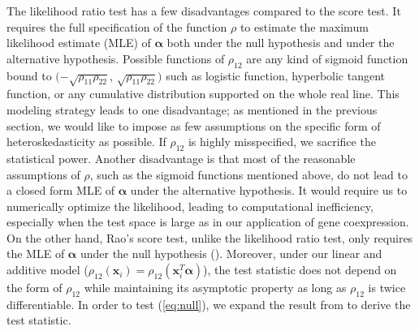 \documentclass[aap,authoryear, preprint]{imsart}
\numberwithin{equation}{section}
\theoremstyle{plain}
\begin{document}
The likelihood ratio test has a few disadvantages compared to the score test. It requires the full specification of the function $\rho$ to estimate the maximum likelihood estimate (MLE) of $\bm{\alpha}$ both under the null hypothesis and under the alternative hypothesis. Possible functions of $\rho_{12}$ are any kind of sigmoid function bound to $(-\sqrt{\rho_{11}\rho_{22}}$, $\sqrt{\rho_{11}\rho_{22}})$ such as logistic function, hyperbolic tangent function, or any cumulative distribution supported on the whole real line. This modeling strategy leads to one disadvantage; as mentioned in the previous section, we would like to impose as few assumptions on the specific form of heteroskedasticity as possible. If $\rho_{12}$ is highly misspecified, we sacrifice the statistical power. Another disadvantage is that most of the reasonable assumptions of $\rho$, such as the sigmoid functions mentioned above, do not lead to a closed form MLE of $\bm{\alpha}$ under the alternative hypothesis. It would require us to numerically optimize the likelihood, leading to computational inefficiency, especially when the test space is large as in our application of gene coexpression. \\

On the other hand, Rao's score test, unlike the likelihood ratio test, only requires the MLE of $\bm{\alpha}$ under the null hypothesis (\cite{rao1973linear}). Moreover, under our linear and additive model ($\rho_{12}(\bm{x}_i) = \rho_{12}(\bm{x}_i^T\bm{\alpha})$), the test statistic does not depend on the form of $\rho_{12}$ while maintaining its asymptotic property as long as $\rho_{12}$ is twice differentiable. In order to test (\ref{eq:null}), we expand the result from \cite{breusch1979simple} to derive the test statistic.\\ 
\end{document}
